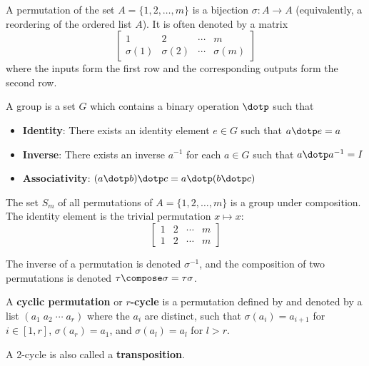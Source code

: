 \begin{definition}[Permutation]
  A permutation of the set $A = \{1, 2, \ldots, m\}$ is a bijection $\sigma : A \to A$ (equivalently, a reordering of the ordered list $A$). It is often denoted by a matrix
  \[
    \begin{bmatrix}
      1 & 2 & \cdots & m \\
      \sigma(1) & \sigma(2) & \cdots & \sigma(m)
    \end{bmatrix}
  \]
  where the inputs form the first row and the corresponding outputs form the second row.
\end{definition}

\begin{definition}[Group]
  A group is a set $G$ which contains a binary operation $\dotp$ such that
  \begin{itemize}
    \item \textbf{Identity}: There exists an identity element $e \in G$ such that $a \dotp e = a$
    \item \textbf{Inverse}: There exists an inverse $a^{-1}$ for each $a \in G$ such that $a \dotp a^{-1} = I$
    \item \textbf{Associativity}: $(a \dotp b) \dotp c = a \dotp (b \dotp c)$
  \end{itemize}
\end{definition}

\begin{theorem}
  The set $S_m$ of all permutations of $A = \{1, 2, \ldots, m\}$ is a group under composition. The identity element is the trivial permutation $x \mapsto x$:
  \[
    \begin{bmatrix}
      1 & 2 & \cdots & m \\
      1 & 2 & \cdots & m
    \end{bmatrix}
  \]

  The inverse of a permutation is denoted $\sigma^{-1}$, and the composition of two permutations is denoted $\tau \compose \sigma = \tau \sigma$.
\end{theorem}

\begin{definition}
  A \textbf{cyclic permutation} or \textbf{$r$-cycle} is a permutation defined by and denoted by a list $(a_1 \; a_2 \; \cdots \; a_r)$ where the $a_i$ are distinct, such that $\sigma(a_i) = a_{i + 1}$ for $i \in [1, r]$, $\sigma(a_r) = a_1$, and $\sigma(a_l) = a_l$ for $l > r$.

  A 2-cycle is also called a \textbf{transposition}.
\end{definition}

